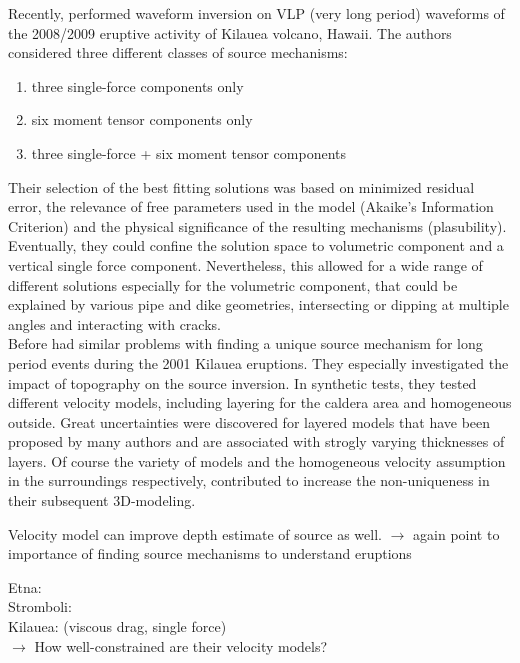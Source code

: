 \documentclass[12pt, a4paper]{article}
\begin{document}
Recently, \citet{Chouet2010} performed waveform inversion on VLP (very long period) waveforms of the 2008/2009 eruptive activity of Kilauea volcano, Hawaii. The authors considered three different classes of source mechanisms:
\begin{enumerate}
	\singlespacing
	\item three single-force components only
	\item six moment tensor components only
	\item three single-force + six moment tensor components
\end{enumerate} 
Their selection of the best fitting solutions was based on minimized residual error, the relevance of free parameters used in the model (Akaike's Information Criterion) and the physical significance of the resulting mechanisms (plasubility). Eventually, they could confine the solution space to volumetric component and a vertical single force component. Nevertheless, this allowed for a wide range of different solutions especially for the volumetric component, that could be explained by various pipe and dike geometries, intersecting or dipping at multiple angles and interacting with cracks.\\
 
Before \citet{Cesca2008} had similar problems with finding a unique source mechanism for long period events during the 2001 Kilauea eruptions. They especially investigated the impact of topography on the source inversion. In synthetic tests, they tested different velocity models, including layering for the caldera area and homogeneous outside. Great uncertainties were discovered for layered models that have been proposed by many authors and are associated with strogly varying thicknesses of layers. Of course the variety of models and the homogeneous velocity assumption in the surroundings respectively, contributed to increase the non-uniqueness in their subsequent 3D-modeling.

Velocity model can improve depth estimate of source as well.
$\rightarrow$ again point to importance of finding source mechanisms to understand eruptions 
 


Etna: \citet{Cannata2009, DeBarros2011}\\
Stromboli: \citet{Chouet1997, Chouet2003, Auger2006}\\
Kilauea: \citet{Cesca2008} (viscous drag, single force)\\

$\rightarrow$ How well-constrained are their velocity models?
\end{document}
